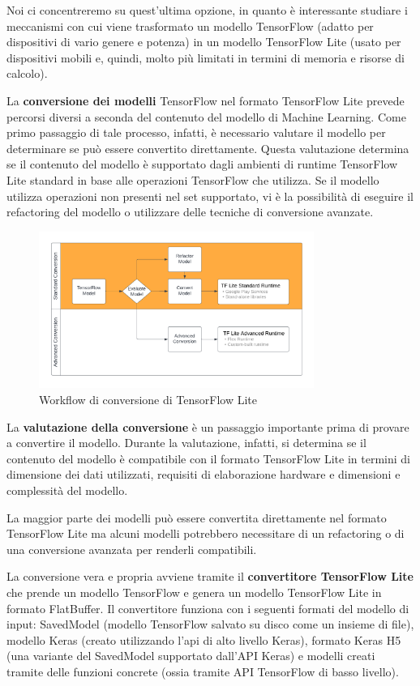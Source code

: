 Noi ci concentreremo su quest’ultima opzione, in quanto è interessante studiare i meccanismi con cui viene trasformato un modello TensorFlow
(adatto per dispositivi di vario genere e potenza) in un modello TensorFlow Lite (usato per dispositivi mobili e, quindi, molto più limitati in termini
di memoria e risorse di calcolo).

La \textbf{conversione dei modelli} TensorFlow nel formato TensorFlow Lite prevede percorsi diversi a seconda del contenuto del modello di Machine Learning.
Come primo passaggio di tale processo, infatti, è necessario valutare il modello per determinare se può essere convertito direttamente.
Questa valutazione determina se il contenuto del modello è supportato dagli ambienti di runtime TensorFlow Lite standard in base alle operazioni
TensorFlow che utilizza. Se il modello utilizza operazioni non presenti nel set supportato, vi è la possibilità di eseguire il refactoring del modello
o utilizzare delle tecniche di conversione avanzate.
\begin{figure}[ht]
    \centering
    \includegraphics[width=0.8\textwidth]{Immagini/workflow.png}
    \caption{Workflow di conversione di TensorFlow Lite}
    \label{fig:workflow}
\end{figure}

La \textbf{valutazione della conversione} è un passaggio importante prima di provare a convertire il modello. Durante la valutazione, infatti,
si determina se il contenuto del modello è compatibile con il formato TensorFlow Lite in termini di dimensione dei dati utilizzati, requisiti di
elaborazione hardware e dimensioni e complessità del modello. 

La maggior parte dei modelli può essere convertita direttamente nel formato TensorFlow Lite ma alcuni modelli potrebbero necessitare di un refactoring o
di una conversione avanzata per renderli compatibili.

La conversione vera e propria avviene tramite il \textbf{convertitore TensorFlow Lite} che prende un modello TensorFlow e genera un modello TensorFlow Lite
in formato FlatBuffer. Il convertitore funziona con i seguenti formati del modello di input: SavedModel (modello TensorFlow salvato su disco come un
insieme di file), modello Keras (creato utilizzando l’api di alto livello Keras), formato Keras H5 (una variante del SavedModel supportato dall’API Keras)
e modelli creati tramite delle funzioni concrete (ossia tramite API TensorFlow di basso livello).

